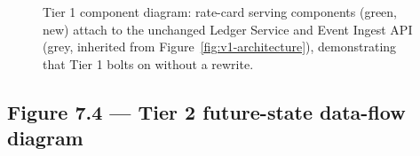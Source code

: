 \begin{figure}[htbp]
\caption{Tier 1 component diagram: rate-card serving components (green, new) attach to the unchanged Ledger Service and Event Ingest API (grey, inherited from Figure~\ref{fig:v1-architecture}), demonstrating that Tier 1 bolts on without a rewrite.}
\label{fig:tier1-component}
\end{figure}

\subsection{Figure 7.4 --- Tier 2 future-state data-flow diagram}

